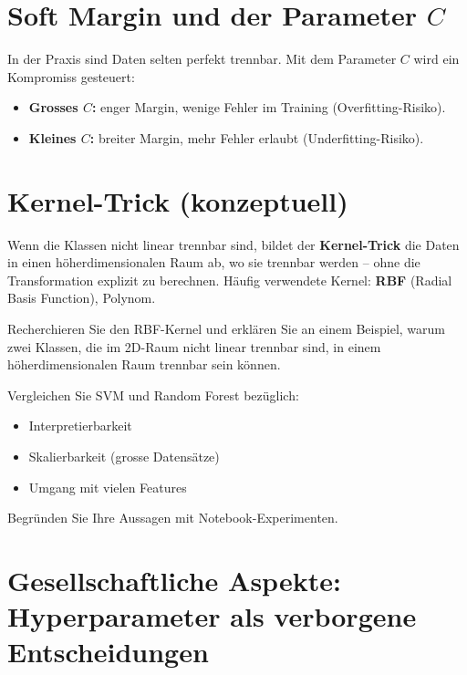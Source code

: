 \section{Soft Margin und der Parameter \texorpdfstring{$C$}{C}}

In der Praxis sind Daten selten perfekt trennbar.
Mit dem Parameter $C$ wird ein Kompromiss gesteuert:
\begin{itemize}
    \item \textbf{Grosses $C$:} enger Margin, wenige Fehler im Training (Overfitting-Risiko).
    \item \textbf{Kleines $C$:} breiter Margin, mehr Fehler erlaubt (Underfitting-Risiko).
\end{itemize}

\section{Kernel-Trick (konzeptuell)}

\begin{mydefinition}
Wenn die Klassen nicht linear trennbar sind, bildet der \textbf{Kernel-Trick}
die Daten in einen höher\-dimensionalen Raum ab, wo sie trennbar werden --
ohne die Transformation explizit zu berechnen.
Häufig verwendete Kernel: \textbf{RBF} (Radial Basis Function), Polynom.
\end{mydefinition}

\begin{mychallenge}
Recherchieren Sie den RBF-Kernel und erklären Sie an einem Beispiel,
warum zwei Klassen, die im 2D-Raum nicht linear trennbar sind,
in einem höherdimensionalen Raum trennbar sein können.
\end{mychallenge}

\begin{mychallenge}
Vergleichen Sie SVM und Random Forest bezüglich:
\begin{itemize}
    \item Interpretierbarkeit
    \item Skalierbarkeit (grosse Datensätze)
    \item Umgang mit vielen Features
\end{itemize}
Begründen Sie Ihre Aussagen mit Notebook-Experimenten.
\end{mychallenge}

\section{Gesellschaftliche Aspekte: Hyperparameter als verborgene Entscheidungen}

